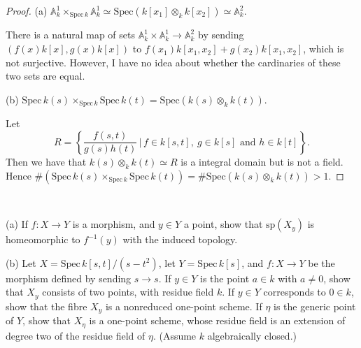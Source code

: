 \begin{proof}
	(a) $\mathbb{A}_k^1 \times_{\mathrm{Spec}\, k} \mathbb{A}_k^1\simeq \mathrm{Spec}(k[x_1]\otimes_k k[x_2])\simeq \mathbb{A}_k^2$.
	
	There is a natural map of sets $\mathbb{A}_k^1\times\mathbb{A}_k^1\to\mathbb{A}_k^2$ by sending $(f(x)k[x],g(x)k[x])$ to $f(x_1)k[x_1,x_2]+g(x_2)k[x_1,x_2]$, which is not surjective. However, I have no idea about whether the cardinaries of these two sets are equal.
	
	(b) $\mathrm{Spec}\, k(s)\times_{\mathrm{Spec}\, k}\mathrm{Spec}\, k(t)=\mathrm{Spec} (k(s)\otimes _k k(t))$.
	
	Let $$R=\left\{\frac{f(s,t)}{g(s)h(t)}\,\Bigg|\,f\in k[s,t],\ g\in k[s]\text{ and }h\in k[t]\right\}.$$Then we have that $k(s)\otimes_k k(t)\simeq R$ is a integral domain but is not a field. Hence $\#(\mathrm{Spec}\, k(s)\times_{\mathrm{Spec}\, k}\mathrm{Spec}\, k(t))=\#\mathrm{Spec} (k(s)\otimes _k k(t))>1$.
\end{proof}

\begin{exe}
	\label{2.3.10}
	\ 
	
	(a) If $f: X\rightarrow Y$ is a morphism, and $y\in Y$ a point, show that $\mathrm{sp}(X_y)$ is homeomorphic to $f^{-1}(y)$
	with the induced topology.
	
	(b) Let $X=\mathrm{Spec}\,k[s,t]/(s-t^2)$, let $Y=\mathrm{Spec}\,k[s]$, and $f:X\to Y$ be the morphism defined by sending $s\to s$. If $y\in Y$ is the point $a\in k$ with $a\neq0$, show that $X_y$ consists of two points, with residue field $k$. If $y\in Y$ corresponds to $0\in k$, show that the fibre $X_y$ is a nonreduced one-point scheme. If $\eta$ is the generic point of $Y$, show that $X_\eta$ is a one-point scheme, whose residue field is an extension of degree two of the residue field of $\eta$. (Assume $k$ algebraically closed.)
\end{exe}

